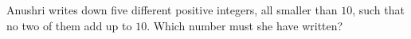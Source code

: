 Anushri writes down five different positive integers, all smaller than $10$, such that no two of them add up to $10$. Which number must she have written?
